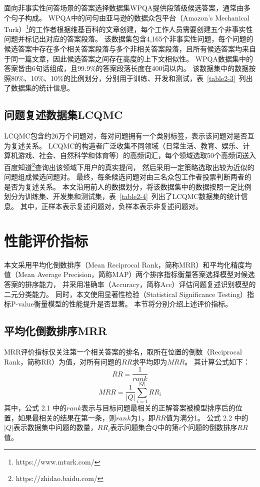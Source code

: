 面向非事实性问答场景的答案选择数据集WPQA提供段落级候选答案，通常由多个句子构成。
WPQA中的问句由亚马逊的数据众包平台（Amazon’s Mechanical Turk）\footnote{https://www.mturk.com/}的工作者根据维基百科的文章创建，每个工作人员需要创建五个非事实性问题并标记出对应的答案段落。
该数据集包含4,165个非事实性问题，每个问题的候选答案中存在多个相关答案段落与多个非相关答案段落，且所有候选答案均来自于同一篇文章，因此候选答案之间存在高度的上下文相似性。
WPQA数据集中的答案皆由6句话组成，且99.9\%的答案段落长度在400词以内。
该数据集中的数据按照80\%、10\%、10\%的比例划分，分别用于训练、开发和测试，表~\ref{table2-3}~列出了数据集的统计信息。



\subsection{问题复述数据集LCQMC}


LCQMC包含约26万个问题对，每对问题拥有一个类别标签，表示该问题对是否互为复述关系。
LCQMC的构造者广泛收集不同领域（日常生活、教育、娱乐、计算机游戏、社会、自然科学和体育等）的高频词汇，每个领域选取50个高频词送入百度知道\footnote{https://zhidao.baidu.com/}查询出该领域下用户的真实提问，
然后采用一定策略选取出较为近似的问题组成候选问题对。
最终，每条候选问题对由三名众包工作者投票判断两者的是否为复述关系。
本文沿用前人的数据划分，将该数据集中的数据按照一定比例划分为训练集、开发集和测试集，表~\ref{table2-4}~列出了LCQMC数据集的统计信息。
其中，正样本表示复述问题对，负样本表示非复述问题对。



\section{性能评价指标}
\label{2.3 性能评价指标}

本文采用平均化倒数排序（Mean Reciprocal Rank，简称MRR）和平均化精度均值（Mean Average Precision，简称MAP）两个排序指标衡量答案选择模型对候选答案的排序能力，
并采用准确率（Accuracy，简称Acc）评估问题复述识别模型的二元分类能力。
同时，本文使用显著性检验（Statistical Significance Testing）\cite{dror2018hitchhiker}指标P-value衡量模型的性能提升是否显著。
本节将分别介绍上述评价指标。

\subsection{平均化倒数排序MRR}

MRR评价指标仅关注第一个相关答案的排名，取所在位置的倒数（Reciprocal Rank，简称RR）为值，对所有问题的$RR$求平均即为$MRR$。
其计算公式如下：
\begin{equation}
    RR = \frac{1}{rank}
\end{equation}
\begin{equation}
    MRR = \frac{1}{|Q|} \sum_{i=1}^{|Q|}RR_i
\end{equation}
其中，公式 2.1 中的$rank$表示与目标问题最相关的正解答案被模型排序后的位置，如果最相关的结果在第一条，则$rank$为1，即$RR$值为满分1。
公式 2.2 中的$|Q|$表示数据集中问题的数量，$RR_i$表示问题集合$Q$中的第$i$个问题的倒数排序$RR$值。

